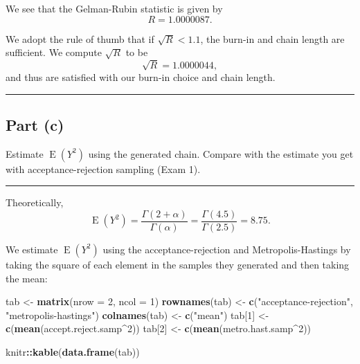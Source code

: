 \documentclass[
  11pt,
]{paper}
\newenvironment{Shaded}{\begin{snugshade}}{\end{snugshade}}
\newcommand{\AttributeTok}[1]{\textcolor[rgb]{0.13,0.29,0.53}{#1}}
\newcommand{\DecValTok}[1]{\textcolor[rgb]{0.00,0.00,0.81}{#1}}
\newcommand{\FunctionTok}[1]{\textcolor[rgb]{0.13,0.29,0.53}{\textbf{#1}}}
\newcommand{\NormalTok}[1]{#1}
\newcommand{\OtherTok}[1]{\textcolor[rgb]{0.56,0.35,0.01}{#1}}
\newcommand{\SpecialCharTok}[1]{\textcolor[rgb]{0.81,0.36,0.00}{\textbf{#1}}}
\newcommand{\StringTok}[1]{\textcolor[rgb]{0.31,0.60,0.02}{#1}}
\begin{document}
We see that the Gelman-Rubin statistic is given by \[
  R = 1.0000087.
\]

We adopt the rule of thumb that if \(\sqrt{R} < 1.1\), the burn-in and
chain length are sufficient. We compute \(\sqrt{R}\) to be \[
  \sqrt{R} = 1.0000044,
\] and thus are satisfied with our burn-in choice and chain length.

\begin{center}\rule{0.5\linewidth}{0.5pt}\end{center}

\hypertarget{part-c}{%
\subsection{Part (c)}\label{part-c}}

Estimate \(\operatorname{E}(Y^2)\) using the generated chain. Compare
with the estimate you get with acceptance-rejection sampling (Exam 1).

\begin{center}\rule{0.5\linewidth}{0.5pt}\end{center}

Theoretically, \[
  \operatorname{E}(Y^2) = \frac{\Gamma(2+\alpha)}{\Gamma(\alpha)} = \frac{\Gamma(4.5)}{\Gamma(2.5)} = 8.75.
\]

We estimate \(\operatorname{E}(Y^2)\) using the acceptance-rejection and
Metropolis-Hastings by taking the square of each element in the samples
they generated and then taking the mean:

\begin{Shaded}
\begin{Highlighting}[]
\NormalTok{tab }\OtherTok{\textless{}{-}} \FunctionTok{matrix}\NormalTok{(}\AttributeTok{nrow =} \DecValTok{2}\NormalTok{, }\AttributeTok{ncol =} \DecValTok{1}\NormalTok{)}
\FunctionTok{rownames}\NormalTok{(tab) }\OtherTok{\textless{}{-}} \FunctionTok{c}\NormalTok{(}\StringTok{"acceptance{-}rejection"}\NormalTok{, }\StringTok{"metropolis{-}hastings"}\NormalTok{)}
\FunctionTok{colnames}\NormalTok{(tab) }\OtherTok{\textless{}{-}} \FunctionTok{c}\NormalTok{(}\StringTok{"mean"}\NormalTok{)}
\NormalTok{tab[}\DecValTok{1}\NormalTok{] }\OtherTok{\textless{}{-}} \FunctionTok{c}\NormalTok{(}\FunctionTok{mean}\NormalTok{(accept.reject.samp}\SpecialCharTok{\^{}}\DecValTok{2}\NormalTok{))}
\NormalTok{tab[}\DecValTok{2}\NormalTok{] }\OtherTok{\textless{}{-}} \FunctionTok{c}\NormalTok{(}\FunctionTok{mean}\NormalTok{(metro.hast.samp}\SpecialCharTok{\^{}}\DecValTok{2}\NormalTok{))}

\NormalTok{knitr}\SpecialCharTok{::}\FunctionTok{kable}\NormalTok{(}\FunctionTok{data.frame}\NormalTok{(tab))}
\end{Highlighting}
\end{Shaded}
\end{document}
